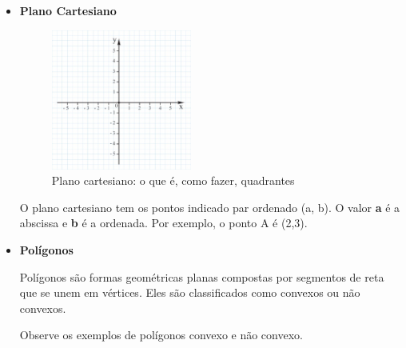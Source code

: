 \begin{escolha}
\begin{boxmedio}
\begin{boxmedio}
{\begin{boxpeq}
\begin{boxpeq}
{\begin{boxpeq}
\begin{boxmedio}
\begin{boxmedio}
\begin{boxpeq}
\begin{boxmedio}
\begin{boxpeq}
\begin{boxpeq}
\begin{boxpeq}
\begin{boxpeq}
\begin{boxmedio}
{\begin{boxmedio}
\begin{boxmedio}
\begin{boxpeq}
\begin{boxmedio}
\begin{boxpeq}
\begin{boxpeq}
\begin{boxpeq}
\begin{escolha}
{\begin{boxmedio}
\begin{boxpeq}
\begin{boxpeq}
\begin{boxpeq}
\begin{boxpeq}
\begin{boxpeq}
\begin{boxmedio}
\begin{boxpeq}
\begin{boxpeq}
\begin{boxpeq}
{\begin{boxpeq}
\begin{boxmedio}
\begin{boxpeq}
\begin{boxpeq}
\begin{boxpeq}
{\begin{boxpeq}
\begin{boxmedio}
{\begin{boxpeq}
\begin{boxpeq}
\begin{boxmedio}
\begin{boxmedio}
\begin{boxpeq}
\begin{boxpeq}
{\begin{boxpeq}
{\begin{itemize}

  \item \textbf{Plano Cartesiano}

\begin{figure}
\centering
\includegraphics[width=1.8125in,height=1.8125in]{./_SAEB_9_MAT/media/image157.jpeg}
\caption{Plano cartesiano: o que é, como fazer, quadrantes}
\end{figure}


O plano cartesiano tem os pontos indicado par ordenado (a, b). O valor
\textbf{a} é a abscissa e \textbf{b} é a ordenada. Por exemplo, o ponto
A é (2,3).

  \item \textbf{Polígonos}

Polígonos são formas geométricas planas compostas por segmentos de reta
que se unem em vértices. Eles são classificados como convexos ou
não convexos.

Observe os exemplos de polígonos convexo e não convexo.


\end{itemize}}
\end{boxpeq}}
\end{boxpeq}
\end{boxpeq}
\end{boxmedio}
\end{boxmedio}
\end{boxpeq}
\end{boxpeq}}
\end{boxmedio}
\end{boxpeq}}
\end{boxpeq}
\end{boxpeq}
\end{boxpeq}
\end{boxmedio}
\end{boxpeq}}
\end{boxpeq}
\end{boxpeq}
\end{boxpeq}
\end{boxmedio}
\end{boxpeq}
\end{boxpeq}
\end{boxpeq}
\end{boxpeq}
\end{boxpeq}
\end{boxmedio}}
\end{escolha}
\end{boxpeq}
\end{boxpeq}
\end{boxpeq}
\end{boxmedio}
\end{boxpeq}
\end{boxmedio}
\end{boxmedio}}
\end{boxmedio}
\end{boxpeq}
\end{boxpeq}
\end{boxpeq}
\end{boxpeq}
\end{boxmedio}
\end{boxpeq}
\end{boxmedio}
\end{boxmedio}
\end{boxpeq}}
\end{boxpeq}
\end{boxpeq}}
\end{boxmedio}
\end{boxmedio}
\end{escolha}
